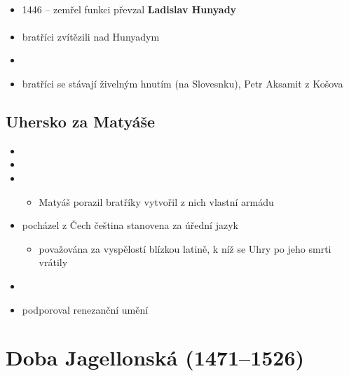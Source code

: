 \paragraph{}
\begin{itemize}
\item 1446 -- zemřel \ra funkci převzal \textbf{Ladislav Hunyady}
\end{itemize}

\paragraph{}
\begin{itemize}
\item bratříci zvítězili nad Hunyadym 
\item {}
\item bratříci se stávají živelným hnutím (na Slovesnku), Petr Aksamit z Košova
\end{itemize}

\subsection{Uhersko za Matyáše}
\begin{itemize}
\item {}
\item {}
\item {}
	\begin{itemize}
	\item Matyáš porazil bratříky \ra vytvořil z nich vlastní armádu
	\end{itemize}
\item pocházel z Čech \ra čeština stanovena za úřední jazyk
	\begin{itemize}
	\item považována za vyspělostí blízkou latině, k níž se Uhry po jeho smrti vrátily
	\end{itemize}
\item {}
\item podporoval renezanční umění
\end{itemize}



\section{Doba Jagellonská (1471--1526)}
